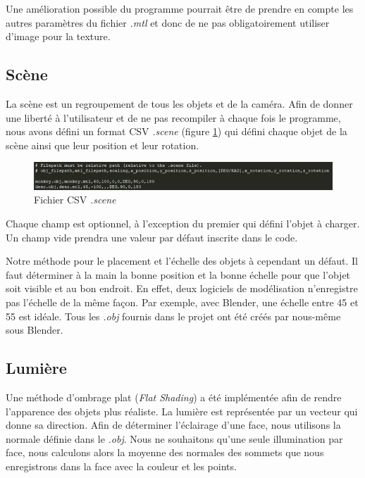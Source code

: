             Une amélioration possible du programme pourrait être de prendre en compte les autres paramètres du fichier \emph{.mtl} et donc de ne pas obligatoirement utiliser d'image pour la texture.

        \subsection{Scène}

            La scène est un regroupement de tous les objets et de la caméra. Afin de donner une liberté à l'utilisateur et de ne pas recompiler à chaque fois le programme, nous avons défini un format CSV \emph{.scene} (figure \ref{fig:scene}) qui défini chaque objet de la scène ainsi que leur position et leur rotation.

            \begin{figure}[h]
                \centering
                \includegraphics[scale=0.8]{img/rendu/scene.png}
                \caption{Fichier CSV \emph{.scene}}
                \label{fig:scene}
            \end{figure}

            Chaque champ est optionnel, à l'exception du premier qui défini l'objet à charger. Un champ vide prendra une valeur par défaut inscrite dans le code.

            Notre méthode pour le placement et l'échelle des objets à cependant un défaut. Il faut déterminer à la main la bonne position et la bonne échelle pour que l'objet soit visible et au bon endroit. En effet, deux logiciels de modélisation n'enregistre pas l'échelle de la même façon. Par exemple, avec Blender, une échelle entre 45 et 55 est idéale. Tous les \emph{.obj} fournis dans le projet ont été créés par nous-même sous Blender.

        \subsection{Lumière}
        \label{subsubsec:lumiere}

        Une méthode d'ombrage plat (\textit{Flat Shading}) a été implémentée afin de rendre l'apparence des objets plus réaliste. La lumière est représentée par un vecteur qui donne sa direction. Afin de déterminer l'éclairage d'une face, nous utilisons la normale définie dans le \emph{.obj}. Nous ne souhaitons qu'une seule illumination par face, nous calculons alors la moyenne des normales des sommets que nous enregistrons dans la face avec la couleur et les points. 

